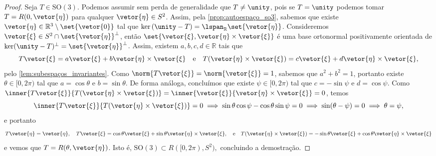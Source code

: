 \begin{proof}
    Seja \(T \in \mathrm{SO}(3)\). Podemos assumir sem perda de generalidade que \(T \neq \unity\), pois se \(T = \unity\) podemos tomar \(T = R(0, \vetor{\eta})\) para qualquer \(\vetor{\eta} \in S^2\). Assim, pela \cref{prop:autoespaço_so3}, sabemos que existe \(\vetor{\eta} \in \mathbb{R}^3 \setminus \set{\vetor{0}}\) tal que \(\ker{(\unity - T)} = \lspan_{\mathbb{R}}\set{\vetor{\eta}}\). Consideremos \(\vetor{\xi} \in S^2 \cap \set{\vetor{\eta}}^\perp\), então \(\set{\vetor{\xi}, \vetor{\eta}\times\vetor{\xi}}\) é uma base ortonormal positivamente orientada de \(\ker(\unity - T)^\perp = \set{\vetor{\eta}}^\perp\). Assim, existem \(a,b,c,d \in \mathbb{R}\) tais que
    \begin{equation*}
        T\vetor{\xi} = a\vetor{\xi} + b \vetor{\eta}\times\vetor{\xi}\quad\text{e}\quad
        T(\vetor{\eta}\times\vetor{\xi}) = c\vetor{\xi} + d\vetor{\eta}\times\vetor{\xi},
    \end{equation*}
    pelo \cref{lem:subespaços_invariantes}. Como \(\norm{T\vetor{\xi}} = \norm{\vetor{\xi}}= 1\), sabemos que \(a^2 + b^2 = 1\), portanto existe \(\theta \in [0,2\pi)\) tal que \(a = \cos\theta\) e \(b = \sin\theta\). De forma análoga, concluímos que existe \(\psi \in [0,2\pi)\) tal que \(c = -\sin\psi\) e \(d = \cos\psi\). Como \(\inner{T\vetor{\xi}}{T(\vetor{\eta}\times\vetor{\xi})} = \inner{\vetor{\xi}}{\vetor{\eta}\times\vetor{\xi}} = 0\), temos
    \begin{equation*}
        \inner{T\vetor{\xi}}{T(\vetor{\eta}\times\vetor{\xi})} = 0 \implies \sin\theta\cos\psi - \cos\theta\sin\psi = 0 \implies \sin(\theta - \psi) = 0 \implies \theta = \psi,
    \end{equation*}
    e portanto
    \begin{equation*}
        T\vetor{\eta} = \vetor{\eta},
        \quad
        T\vetor{\xi} = \cos\theta \vetor{\xi} + \sin\theta \vetor{\eta}\times\vetor{\xi},
        \quad \text{e}\quad
        T(\vetor{\eta}\times\vetor{\xi}) = -\sin\theta \vetor{\xi} + \cos\theta \vetor{\eta}\times\vetor{\xi}
    \end{equation*}
    e vemos que \(T = R(\theta, \vetor{\eta})\). Isto é, \(\mathrm{SO}(3) \subset R([0,2\pi), S^2),\) concluindo a demostração.
\end{proof}

